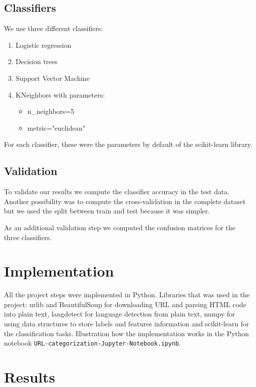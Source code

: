 \documentclass{article} %
\begin{document}
\subsection{Classifiers}

 We use three different classifiers:

  \begin{enumerate}   
    \item Logistic regression
    \item Decision trees
    \item Support Vector Machine
  	\item KNeighbors with parameters:
      \begin{itemize}
           \item n\_neighbors=5
           \item metric="euclidean" 
       \end{itemize}
   \end{enumerate}

For each classifier, these were the parameters by default of the scikit-learn library. 
 
\subsection{Validation}
 
 To validate our results we compute the classifier accuracy in the test data. Another possibility was to compute the cross-validation in the complete dataset but we used the split between train and test because it was simpler. 

 As an additional validation step we computed the confusion matrices for the three classifiers.
 
\section{Implementation}
 All the project steps were implemented in Python. Libraries that was used in the project: urlib and BeautifulSoup for downloading URL and parsing HTML code into plain text, langdetect for language detection from plain text, numpy for using data structures to store labels and features information and scikit-learn for the classification tasks. Illustration how the implementation works in the Python notebook \texttt{URL-categorization-Jupyter-Notebook.ipynb}.


\section{Results}
\end{document}

